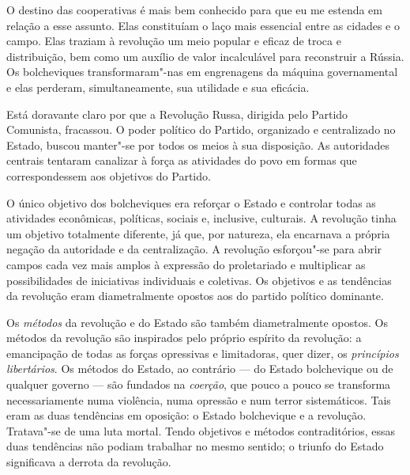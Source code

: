 O destino das cooperativas é mais bem conhecido para que eu me estenda
em relação a esse assunto. Elas constituíam o laço mais essencial entre
as cidades e o campo. Elas traziam à revolução um meio popular e eficaz
de troca e distribuição, bem como um auxílio de valor incalculável
para reconstruir a Rússia. Os bolcheviques transformaram"-nas em
engrenagens da máquina governamental e elas perderam, simultaneamente,
sua utilidade e sua eficácia.

\sectionitem
Está doravante claro por que a Revolução Russa, dirigida pelo Partido
Comunista, fracassou. O poder político do Partido, organizado e
centralizado no Estado, buscou manter"-se por todos os meios à sua
disposição. As autoridades centrais tentaram canalizar à força as
atividades do povo em formas que correspondessem aos objetivos do Partido.

O único objetivo dos bolcheviques era reforçar o Estado e controlar
todas as atividades econômicas, políticas, sociais e, inclusive,
culturais. A revolução tinha um objetivo totalmente diferente,
já que, por natureza, ela encarnava a própria negação da autoridade
e da centralização. A revolução esforçou"-se para abrir campos cada
vez mais amplos à expressão do proletariado e multiplicar as
possibilidades de iniciativas individuais e coletivas. Os objetivos e
as tendências da revolução eram diametralmente opostos aos do
partido político dominante.

Os \textit{métodos} da revolução e do Estado são também diametralmente opostos. 
Os métodos da revolução são inspirados pelo próprio espírito da
revolução: a emancipação de todas as forças opressivas e limitadoras,
quer dizer, os \textit{princípios libertários}. Os métodos do Estado, ao
contrário --- do Estado bolchevique ou de qualquer governo --- são fundados
na \textit{coerção}, que pouco a pouco se transforma necessariamente numa
violência, numa opressão e num terror sistemáticos. Tais eram as duas
tendências em oposição: o Estado bolchevique e a revolução.
Tratava"-se de uma luta mortal. Tendo objetivos e métodos
contraditórios, essas duas tendências não podiam trabalhar no mesmo
sentido; o triunfo do Estado significava a derrota da revolução.

